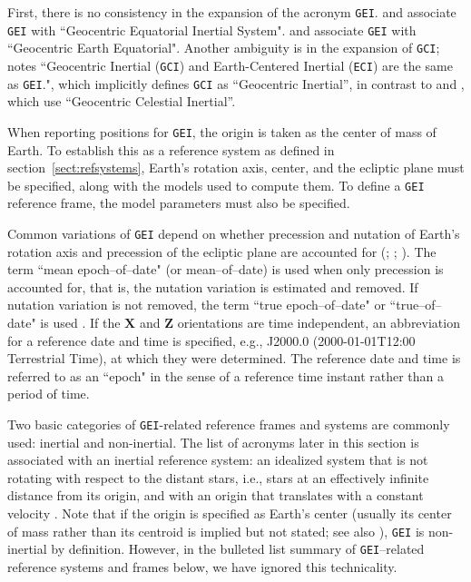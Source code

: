 \documentclass[draft]{agujournal2019}
\begin{document}
First, there is no consistency in the expansion of the acronym \texttt{GEI}.  and  associate \texttt{GEI} with ``Geocentric Equatorial Inertial System".  and  associate \texttt{GEI} with ``Geocentric Earth Equatorial". Another ambiguity is in the expansion of \texttt{GCI};  notes ``Geocentric Inertial (\texttt{GCI}) and Earth-Centered Inertial (\texttt{ECI}) are the same as \texttt{GEI}.", which implicitly defines \texttt{GCI} as ``Geocentric Inertial'', in contrast to  and
, which use ``Geocentric Celestial Inertial''. 


When reporting positions for \texttt{GEI}, the origin is taken as the center of mass of Earth. To establish this as a reference system as defined in section~\ref{sect:refsystems}, Earth's rotation axis, center, and the ecliptic plane must be specified, along with the models used to compute them. To define a \texttt{GEI} reference frame, the model parameters must also be specified.

Common variations of \texttt{GEI} depend on whether precession and nutation of Earth's rotation axis and precession of the ecliptic plane are accounted for (; ; ). The term ``mean epoch--of--date" (or mean--of--date) is used when only precession is accounted for, that is, the nutation variation is estimated and removed. If nutation variation is not removed, the term ``true epoch--of--date" or ``true--of--date" is used \cite{Hapgood1995}. If the $\mathbf{X}$ and $\mathbf{Z}$ orientations are time independent, an abbreviation for a reference date and time is specified, e.g., J2000.0 (2000-01-01T12:00 Terrestrial Time), at which they were determined. The reference date and time is referred to as an ``epoch" in the sense of a reference time instant rather than a period of time.

Two basic categories of \texttt{GEI}-related reference frames and systems are commonly used: inertial and non-inertial. The list of acronyms later in this section is associated with an inertial reference system: an idealized system that is not rotating with respect to the distant stars, i.e., stars at an effectively infinite distance from its origin, and with an origin that translates with a constant velocity \cite{NAIFOverview2023}. Note that if the origin is specified as Earth's center (usually its center of mass rather than its centroid is implied but not stated; see also ), \texttt{GEI} is non-inertial by definition. However, in the bulleted list summary of \texttt{GEI}--related reference systems and frames below, we have ignored this technicality.
\end{document}
